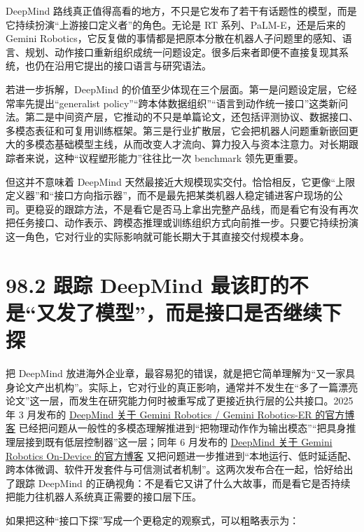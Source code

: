 DeepMind 路线真正值得高看的地方，不只是它发布了若干有话题性的模型，而是它持续扮演“上游接口定义者”的角色。无论是 RT 系列、PaLM-E，还是后来的 Gemini Robotics，它反复做的事情都是把原本分散在机器人子问题里的感知、语言、规划、动作接口重新组织成统一问题设定。很多后来者即便不直接复现其系统，也仍在沿用它提出的接口语言与研究语法。

若进一步拆解，DeepMind 的价值至少体现在三个层面。第一是问题设定层，它经常率先提出“generalist policy”“跨本体数据组织”“语言到动作统一接口”这类新问法。第二是中间资产层，它推动的不只是单篇论文，还包括评测协议、数据接口、多模态表征和可复用训练框架。第三是行业扩散层，它会把机器人问题重新嵌回更大的多模态基础模型主线，从而改变人才流向、算力投入与资本注意力。对长期跟踪者来说，这种“议程塑形能力”往往比一次 benchmark 领先更重要。

但这并不意味着 DeepMind 天然最接近大规模现实交付。恰恰相反，它更像“上限定义器”和“接口方向指示器”，而不是最先把某类机器人稳定铺进客户现场的公司。更稳妥的跟踪方法，不是看它是否马上拿出完整产品线，而是看它有没有再次把任务接口、动作表示、跨模态推理或训练组织方式向前推一步。只要它持续扮演这一角色，它对行业的实际影响就可能长期大于其直接交付规模本身。

\section*{98.2 跟踪 DeepMind 最该盯的不是“又发了模型”，而是接口是否继续下探}


把 DeepMind 放进海外企业章，最容易犯的错误，就是把它简单理解为“又一家具身论文产出机构”。实际上，它对行业的真正影响，通常并不发生在“多了一篇漂亮论文”这一层，而发生在研究能力何时被重写成了更接近执行层的公共接口。2025 年 3 月发布的 \href{https://deepmind.google/blog/gemini-robotics-brings-ai-into-the-physical-world/}{DeepMind 关于 Gemini Robotics / Gemini Robotics-ER 的官方博客} 已经把问题从一般性的多模态理解推进到“把物理动作作为输出模态”“把具身推理层接到既有低层控制器”这一层；同年 6 月发布的 \href{https://deepmind.google/blog/gemini-robotics-on-device-brings-ai-to-local-robotic-devices/}{DeepMind 关于 Gemini Robotics On-Device 的官方博客} 又把问题进一步推进到“本地运行、低时延适配、跨本体微调、软件开发套件与可信测试者机制”。这两次发布合在一起，恰好给出了跟踪 DeepMind 的正确视角：不是看它又讲了什么大故事，而是看它是否持续把能力往机器人系统真正需要的接口层下压。

如果把这种“接口下探”写成一个更稳定的观察式，可以粗略表示为：

